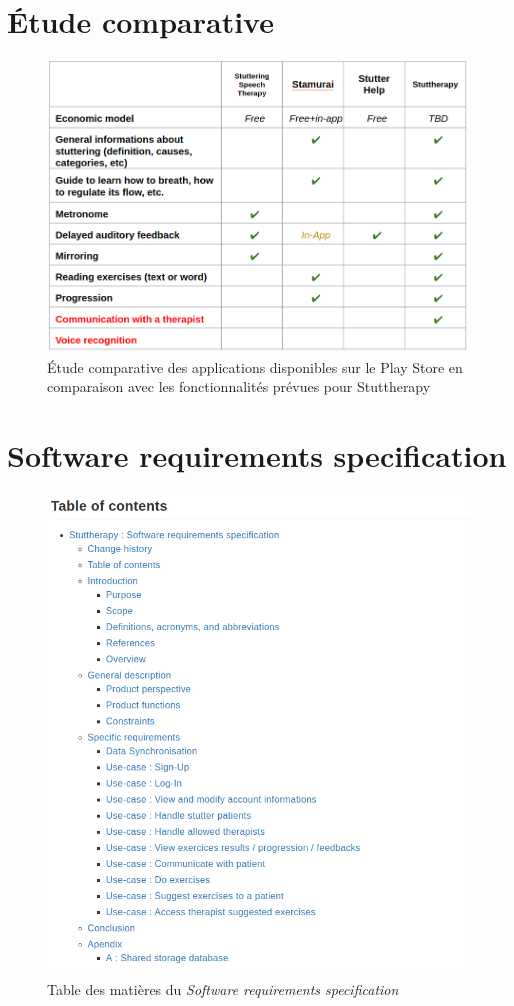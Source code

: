 \begin{appendices}
\chapter{Étude comparative}
\label{appendix:market}
\begin{figure}[h]
  \includegraphics[width=1\linewidth]{content/imgs/market.png}
  \caption*{Étude comparative des applications disponibles sur le Play Store en comparaison avec les fonctionnalités prévues pour Stuttherapy}
\end{figure}

\chapter{Software requirements specification}
\label{appendix:srs}
\begin{figure}[h]
  \includegraphics[width=0.7\linewidth]{content/imgs/srs_contents.png}
  \caption*{Table des matières du \textit{Software requirements specification}}
\end{figure}


\end{appendices}
